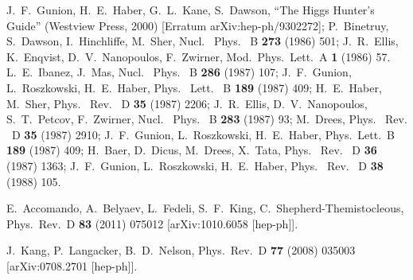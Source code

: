 \documentclass[12pt,a4paper]{article}
\begin{document}
\begin{thebibliography}{999}
J.~F.~Gunion, H.~E.~Haber, G.~L.~Kane, S.~Dawson,
``The Higgs Hunter's Guide'' (Westview Press, 2000) [Erratum arXiv:hep-ph/9302272];
P.~Binetruy, S.~Dawson, I.~Hinchliffe, M.~Sher,
Nucl. \ Phys. \ B {\bf 273} (1986) 501;
J.~R.~Ellis, K.~Enqvist, D.~V.~Nanopoulos, F.~Zwirner,
Mod.\ Phys.\ Lett.\  A {\bf 1} (1986) 57.
L.~E.~Ibanez, J.~Mas,
Nucl. \ Phys. \ B {\bf 286} (1987) 107;
J.~F.~Gunion, L.~Roszkowski, H.~E.~Haber,
Phys. \ Lett. \ B {\bf 189} (1987) 409;
H.~E.~Haber, M.~Sher,
Phys. \ Rev. \ D {\bf 35} (1987) 2206;
J.~R.~Ellis, D.~V.~Nanopoulos, S.~T.~Petcov, F.~Zwirner,
Nucl. \ Phys. \ B {\bf 283} (1987) 93;
M.~Drees,
Phys. \ Rev. \ D {\bf 35} (1987) 2910;
J.~F.~Gunion, L.~Roszkowski, H.~E.~Haber,
Phys.\ Lett.\  B {\bf 189} (1987) 409;
H.~Baer, D.~Dicus, M.~Drees, X.~Tata,
Phys. \ Rev. \ D {\bf 36} (1987) 1363;
J.~F.~Gunion, L.~Roszkowski, H.~E.~Haber,
Phys. \ Rev. \ D {\bf 38} (1988) 105.


E.~Accomando, A.~Belyaev, L.~Fedeli, S.~F.~King, C.~Shepherd-Themistocleous,
Phys.\ Rev.\  D {\bf 83} (2011) 075012
[arXiv:1010.6058 [hep-ph]].

J.~Kang, P.~Langacker, B.~D.~Nelson,
Phys.\ Rev.\  D {\bf 77} (2008) 035003
[arXiv:0708.2701 [hep-ph]].


\end{thebibliography}
\end{document}
